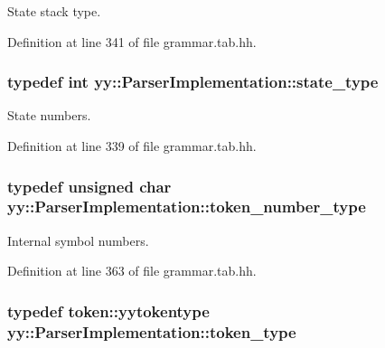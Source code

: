 State stack type. 



Definition at line 341 of file grammar.tab.hh.

\hypertarget{classyy_1_1_parser_implementation_aff695fe39c8a45b9036b85b9156276e8}{
\subsubsection[{state\_\-type}]{\setlength{\rightskip}{0pt plus 5cm}typedef int {\bf yy::ParserImplementation::state\_\-type}}}
\label{classyy_1_1_parser_implementation_aff695fe39c8a45b9036b85b9156276e8}


State numbers. 



Definition at line 339 of file grammar.tab.hh.

\hypertarget{classyy_1_1_parser_implementation_a729ec5de6d4445eb556d2db42cbb4bde}{
\subsubsection[{token\_\-number\_\-type}]{\setlength{\rightskip}{0pt plus 5cm}typedef unsigned char {\bf yy::ParserImplementation::token\_\-number\_\-type}}}
\label{classyy_1_1_parser_implementation_a729ec5de6d4445eb556d2db42cbb4bde}


Internal symbol numbers. 



Definition at line 363 of file grammar.tab.hh.

\hypertarget{classyy_1_1_parser_implementation_ae715e0b25dc35fa1c81dc46a7f5262b6}{
\subsubsection[{token\_\-type}]{\setlength{\rightskip}{0pt plus 5cm}typedef {\bf token::yytokentype} {\bf yy::ParserImplementation::token\_\-type}}}
\label{classyy_1_1_parser_implementation_ae715e0b25dc35fa1c81dc46a7f5262b6}


